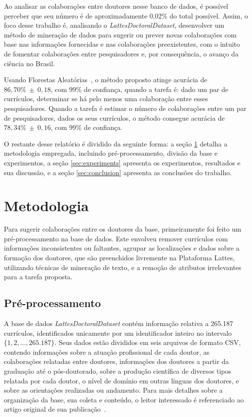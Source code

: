\documentclass[12pt]{article}
\begin{document}
Ao analisar as colaborações entre doutores nesse banco de dados, é possível perceber que seu número é de aproximadamente 0,02\% do total possível.
Assim, o foco desse trabalho é, analisando o \emph{LattesDoctoralDataset}, desenvolver um método de mineração de dados para sugerir ou prever novas colaborações com base nas informações fornecidas e nas colaborações preexistentes, com o intuito de fomentar colaborações entre pesquisadores e, por consequência, o avanço da ciência no Brasil.

Usando Florestas Aleatórias~\cite{random-forests}, o método proposto atinge acurácia de $86,70\%~\pm~0,18$, com 99\% de confiança, quando a tarefa é: dado um par de currículos, determinar se há pelo menos uma colaboração entre esses pesquisadores.
Quando a tarefa é estimar o número de colaborações entre um par de pesquisadores, dados os seus currículos, o método consegue acurácia de $78,34\%~\pm~0,16$, com 99\% de confiança.

O restante desse relatório é dividido da seguinte forma: a seção \ref{sec:methods} detalha a metodologia empregada, incluindo pré-processamento, divisão da base e experimentos, a seção \ref{sec:experiments} apresenta os experimentos, resultados e sua discussão, e a seção \ref{sec:conclusion} apresenta as conclusões do trabalho.

\section{Metodologia}
\label{sec:methods}

Para sugerir colaborações entre os doutores da base, primeiramente foi feito um pré-processamento na base de dados.
Este envolveu remover currículos com informações inconsistentes ou faltantes, agrupar as localizações e dados sobre a formação dos doutores, que são preenchidos livremente na Plataforma Lattes, utilizando técnicas de mineração de texto, e a remoção de atributos irrelevantes para a tarefa proposta.


\subsection{Pré-processamento}
\label{sec:preprocess}

A base de dados \emph{LattesDoctoralDataset} contém informação relativa a 265.187 currículos, identificados unicamente por um identificador inteiro no intervalo $\{1, 2, ..., 265.187\}$.
Seus dados estão divididos em seis arquivos de formato CSV, contendo informações sobre a atuação profissional de cada doutor, as colaborações relatadas entre doutores, informações dos doutores a partir da graduação até o pós-doutorado, sobre a produção científica de diversos tipos relatada por cada doutor, o nível de domínio em outras línguas dos doutores, e sobre as orientações realizadas ou andamento.
Para mais detalhes sobre a organização da base, sua coleta e conteúdo, o leitor interessado é referenciado ao artigo original de sua publicação~\cite{lattes-dataset}.
\end{document}
